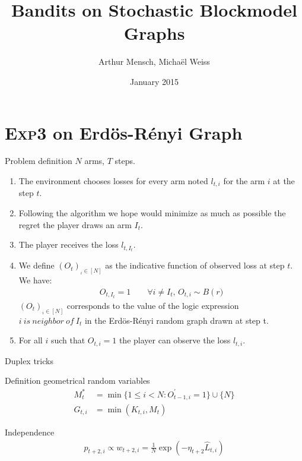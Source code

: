 \documentclass[11pt)]{beamer}
\author{Arthur Mensch, Michaël Weiss}
\title{Bandits on Stochastic Blockmodel Graphs}
\institute{Reinforcement Learning}
\date{January 2015}
\begin{document}
\begin{frame}
\titlepage
\end{frame}

\section{\textsc{Exp3} on Erdös-Rényi Graph}
\begin{frame}{Problem definition}
$N$ arms, $T$ steps.
\begin{enumerate}
\item The environment chooses losses for every arm noted $l_{t,i}$ for the arm $i$ at the step $t$.
\item Following the algorithm we hope would minimize as much as possible the regret the player draws an arm $I_t$.
\item The player receives the loss $l_{t,I_t}$.
\item We define $\left(O_t\right)_{_i\in\left[N\right]}$ as the indicative function of observed loss at step $t$. We have:
\begin{align*}
O_{t,I_t}=1 \qquad \forall i \neq I_t,\, O_{t,i} \sim B\left(r\right.)
\end{align*}
$\left(O_t\right)_{_i\in\left[N\right]}$ corresponds to the value of the logic expression $ i \ is\ neighbor\ of\ I_t$ in the Erdös-Rényi random graph drawn at step t.
\item For all $i$ such that $O_{t,i}=1$ the player can observe the loss $l_{t,i}$.
\end{enumerate}
\end{frame}

\begin{frame}{Duplex tricks}
\begin{block}{Definition geometrical random variables}
\begin{align*}
M_t^* &=\min\{1\leq i<N: O_{t-1,i}^{'} =1\}\cup\{N\}\\
G_{t,i}&=\min\left(K_{t,i},M_t\right)
\end{align*}
\end{block}
\begin{block}{Independence}
\begin{align*}
p_{t+2,i}\propto w_{t+2,i}= \frac{1}{N} \exp\left( -\eta_{t+2} \hat{L}_{t,i} \right)
\end{align*}
\end{block}
\end{frame}
\end{document}
